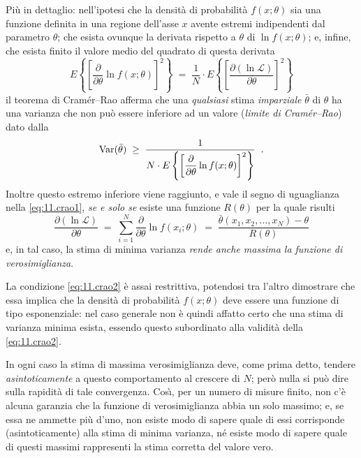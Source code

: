 Pi\`u in dettaglio: nell'ipotesi che la densit\`a di
probabilit\`a $f(x;\theta)$ sia una funzione definita in una
regione dell'asse $x$ avente estremi indipendenti dal
parametro $\theta$; che esista ovunque la derivata rispetto
a $\theta$ di $\ln f(x; \theta)$; e, infine, che esista
finito il valore medio del quadrato di questa derivata
\begin{equation*}
  E \left\{ \left[ \frac{\partial}{\partial
    \theta} \ln f(x; \theta) \right]^2 \right\} \; = \; \frac{1}{N} \cdot E
    \left\{ \left[ \frac{\partial (\ln \mathcal{L})}{\partial
    \theta} \right]^2 \right\}
\end{equation*}
il teorema di Cram\'er--Rao afferma che una \emph{qualsiasi}
stima \emph{imparziale} $\bar \theta$ di $\theta$ ha una
varianza che non pu\`o essere inferiore ad un valore
(\emph{limite di Cram\'er--Rao}) dato dalla
\begin{equation} \label{eq:11.crao1}
  \operatorname{Var}( \bar \theta ) \;
    \ge \; \frac{1}{N \cdot E \left\{ \left[ \dfrac{\partial
    }{\partial \theta} \ln f(x; \theta) \right]^2 \right\} }
    \;\; .
\end{equation}
Inoltre questo estremo inferiore viene raggiunto, e vale il
segno di uguaglianza nella \eqref{eq:11.crao1}, \emph{se e
  solo se} esiste una funzione $R(\theta)$ per la quale
risulti
\begin{equation} \label{eq:11.crao2}
  \frac{\partial (\ln \mathcal{L}) }{\partial \theta} \; = \;
    \sum_{i=1}^N \frac{\partial}{\partial
    \theta} \ln f(x_i; \theta) \; = \; \frac{\bar
    \theta(x_1, x_2, \ldots, x_N) - \theta}{R(\theta)}
\end{equation}
e, in tal caso, la stima di minima varianza \emph{rende
anche massima la funzione di verosimiglianza}.

La condizione \eqref{eq:11.crao2} \`e assai restrittiva,
potendosi tra l'altro dimostrare che essa implica che la
densit\`a di probabilit\`a $f(x; \theta)$ deve essere una
funzione di tipo esponenziale: nel caso generale non \`e
quindi affatto certo che una stima di varianza minima
esista, essendo questo subordinato alla validit\`a della
\eqref{eq:11.crao2}.

In ogni caso la stima di massima verosimiglianza deve, come
prima detto, tendere \emph{asintoticamente} a questo
comportamento al crescere di $N$; per\`o nulla si pu\`o dire
sulla rapidit\`a di tale convergenza.  Cos\`\i, per un
numero di misure finito, non c'\`e alcuna garanzia che la
funzione di verosimiglianza abbia un solo massimo; e, se
essa ne ammette pi\`u d'uno, non esiste modo di sapere quale
di essi corrisponde (asintoticamente) alla stima di minima
varianza, n\'e esiste modo di sapere quale di questi massimi
rappresenti la stima corretta del valore vero.%

